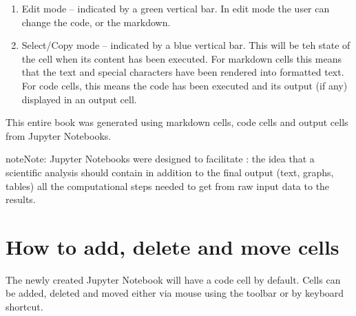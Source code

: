 \documentclass[letterpaper,10pt,english]{jupyterBook}
\begin{document}
\sphinxAtStartPar
{}
\begin{enumerate}
%
\item {} 
\sphinxAtStartPar
Edit mode – indicated by a green vertical bar. In edit mode the user can change the code, or the markdown.

\item {} 
\sphinxAtStartPar
Select/Copy mode – indicated by a blue vertical bar.  This will be teh state of the cell when its content has been executed.  For markdown cells this means that the text and special characters have been rendered into formatted text.  For code cells, this means the code has been executed and its output (if any) displayed in an output cell.

\end{enumerate}

\sphinxAtStartPar
{}

\sphinxAtStartPar
This entire book was generated using markdown cells, code cells and output cells from Jupyter Notebooks.

\begin{sphinxadmonition}{note}{Note:}
\sphinxAtStartPar
Jupyter Notebooks were designed to facilitate : the idea that a scientific analysis should contain \sphinxhyphen{} in addition to the final output (text, graphs, tables) \sphinxhyphen{} all the computational steps needed to get from raw input data to the results.
\end{sphinxadmonition}


\section{How to add, delete and move cells}
\label{\detokenize{content/04_PythonEssentials/Intro_Jupyter_notebook:how-to-add-delete-and-move-cells}}
\sphinxAtStartPar
The newly created Jupyter Notebook will have a code cell by default.  Cells can be added, deleted and moved either via mouse using the toolbar or by keyboard shortcut.
\end{document}
